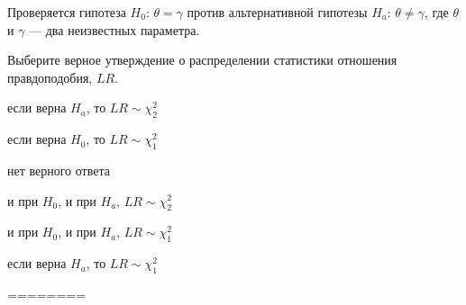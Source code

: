 
\begin{question}
Проверяется гипотеза \(H_0\): \(\theta = \gamma\) против альтернативной
гипотезы \(H_a\): \(\theta \neq \gamma\), где \(\theta\) и \(\gamma\)
--- два неизвестных параметра.

Выберите верное утверждение о распределении статистики отношения
правдоподобия, \(LR\).
\begin{answerlist}
  \item если верна \(H_a\), то \(LR \sim \chi_2^2\)
  \item если верна \(H_0\), то \(LR \sim \chi_1^2\)
  \item нет верного ответа
  \item и при \(H_0\), и при \(H_a\), \(LR \sim \chi_2^2\)
  \item и при \(H_0\), и при \(H_a\), \(LR \sim \chi_1^2\)
  \item если верна \(H_a\), то \(LR \sim \chi_1^2\)
\end{answerlist}
\end{question}

\begin{solution}
========
\end{solution}

